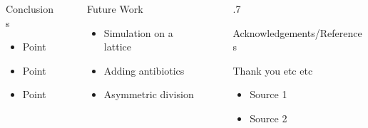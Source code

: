 \documentclass[final]{beamer}
\newlength{\sepwid}
\newlength{\onecolwid}
\begin{document}
\begin{frame}[t]
\begin{block}
\begin{columns}[t]
\begin{column}{\onecolwid}
  \begin{alertblock}{Conclusions}
    \begin{itemize}
      \item Point
      \item Point
      \item Point
    \end{itemize}
    \vspace{.005\baselineskip}
  \end{alertblock}
\end{column}

\begin{column}{\sepwid}\end{column} %

\begin{column}{\onecolwid}
  \begin{alertblock}{Future Work}
    \begin{itemize}
      \item Simulation on a lattice
      \item Adding antibiotics
      \item Asymmetric division
    \end{itemize}

    \vspace{.05ex}
  \end{alertblock}
\end{column}

\begin{column}{\sepwid}\end{column} %

\begin{column}{.7\onecolwid}
  \begin{alertblock}{Acknowledgements/References}

      Thank you etc etc

    \begin{itemize}
      \item Source 1
      \item Source 2
    \end{itemize}
  \end{alertblock}
\end{column}
\end{columns} %
\end{block}


\end{frame} %
\end{document}
